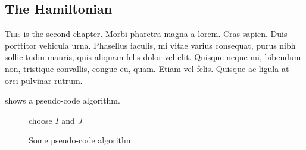 \subsection{The Hamiltonian}
\label{subsec:chap-fourth-first}

\lettrine{T}{his} is the second chapter.
Morbi pharetra magna a lorem.
Cras sapien.
Duis porttitor vehicula urna.
Phasellus iaculis, mi vitae varius consequat, purus nibh sollicitudin mauris, quis aliquam felis dolor vel elit.
Quisque neque mi, bibendum non, tristique convallis, congue eu, quam.
Etiam vel felis.
Quisque ac ligula at orci pulvinar rutrum.

 shows a pseudo-code algorithm.
\begin{figure}[!ht]
  \begin{algorithm}[H] %
  
    choose \(I\) and \(J\)\;
  \end{algorithm}
  \caption{Some pseudo-code algorithm}
  \label{fig:chap-second-algorithm}
\end{figure}
 